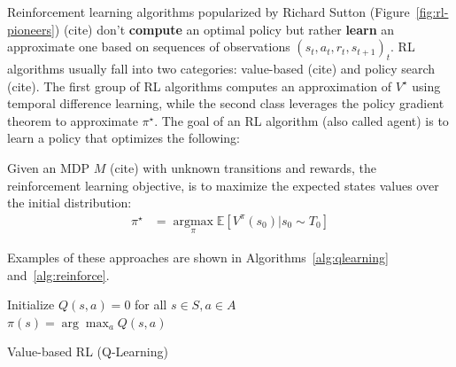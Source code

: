 Reinforcement learning algorithms popularized by Richard Sutton (Figure~\ref{fig:rl-pioneers}) (cite) don't \textbf{compute} an optimal policy but rather \textbf{learn} an approximate one based on sequences of observations ${(s_t, a_t, r_t, s_{t+1})}_t$.
RL algorithms usually fall into two categories: value-based (cite) and policy search (cite).
The first group of RL algorithms computes an approximation of $V^{\star}$ using temporal difference learning, while the second class leverages the policy gradient theorem to approximate $\pi^{\star}$.
The goal of an RL algorithm (also called agent) is to learn a policy that optimizes the following:
\begin{definition} Given an MDP $M$ (cite) with unknown transitions and rewards, the reinforcement learning objective, is to maximize the expected states values over the initial distribution:
\begin{align}
    \pi^{\star} &= \underset{\pi}{\operatorname{argmax}}\mathbb{E}\left[V^{\pi}(s_0)|s_0\sim T_0 \right]
\end{align}
\end{definition}

Examples of these approaches are shown in Algorithms~\ref{alg:qlearning} and~\ref{alg:reinforce}.

\begin{algorithm}
    Initialize $Q(s,a) = 0$ for all $s \in S, a \in A$ \\
    $\pi(s) = \arg\max_a Q(s,a)$ 
    \caption{Value-based RL (Q-Learning)}\label{alg:qlearning}
\end{algorithm}


